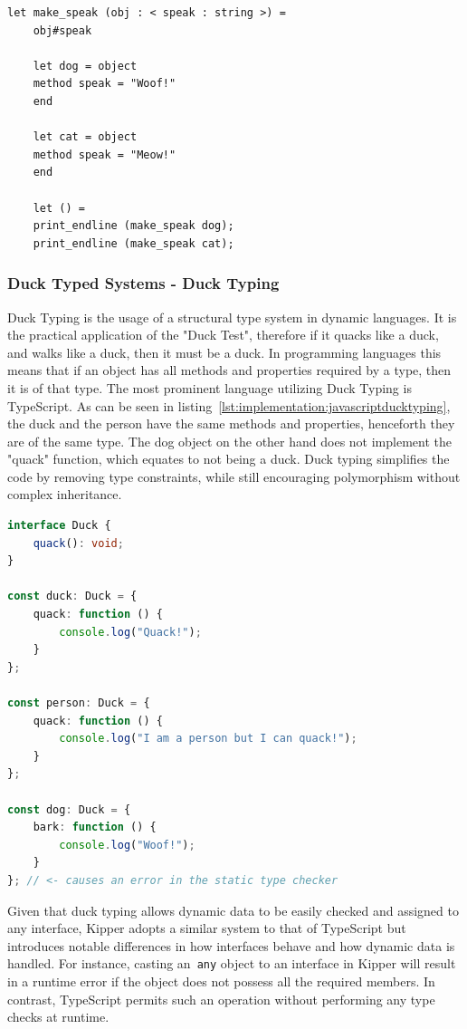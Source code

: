 \begin{lstlisting}[language=caml,caption=Example of structural typing in Ocaml,label=lst:implementation:ocamlstructuraltyping]
	let make_speak (obj : < speak : string >) =
	obj#speak

	let dog = object
	method speak = "Woof!"
	end

	let cat = object
	method speak = "Meow!"
	end

	let () =
	print_endline (make_speak dog);
	print_endline (make_speak cat);
\end{lstlisting}

\subsubsection{Duck Typed Systems - Duck Typing}

Duck Typing is the usage of a structural type system in dynamic languages. It is the practical application of the "Duck Test", therefore if it quacks like a duck, and walks like a duck, then it must be a duck. In programming languages this means that if an object has all methods and properties required by a type, then it is of that type. The most prominent language utilizing Duck Typing is TypeScript. As can be seen in listing~\ref{lst:implementation:javascriptducktyping}, the duck and the person have the same methods and properties, henceforth they are of the same type. The dog object on the other hand does not implement the "quack" function, which equates to not being a duck. Duck typing simplifies the code by removing type constraints, while still encouraging polymorphism without complex inheritance.

\begin{lstlisting}[language=Typescript,caption=Example of duck typing in TypeScript,label=lst:implementation:javascriptducktyping]
interface Duck {
	quack(): void;
}

const duck: Duck = {
	quack: function () {
		console.log("Quack!");
	}
};

const person: Duck = {
	quack: function () {
		console.log("I am a person but I can quack!");
	}
};

const dog: Duck = {
	bark: function () {
		console.log("Woof!");
	}
}; // <- causes an error in the static type checker
\end{lstlisting}

Given that duck typing allows dynamic data to be easily checked and assigned to any interface, Kipper adopts a similar system to that of TypeScript but introduces notable differences in how interfaces behave and how dynamic data is handled. For instance, casting an~\lstinline|any| object to an interface in Kipper will result in a runtime error if the object does not possess all the required members. In contrast, TypeScript permits such an operation without performing any type checks at runtime.

